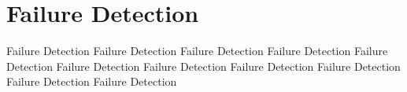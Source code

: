 \documentclass[dareport.tex]{subfiles}
\begin{document}
\section{Failure Detection}
Failure Detection
Failure Detection
Failure Detection
Failure Detection
Failure Detection
Failure Detection
Failure Detection
Failure Detection
Failure Detection
Failure Detection
Failure Detection
\end{document}
